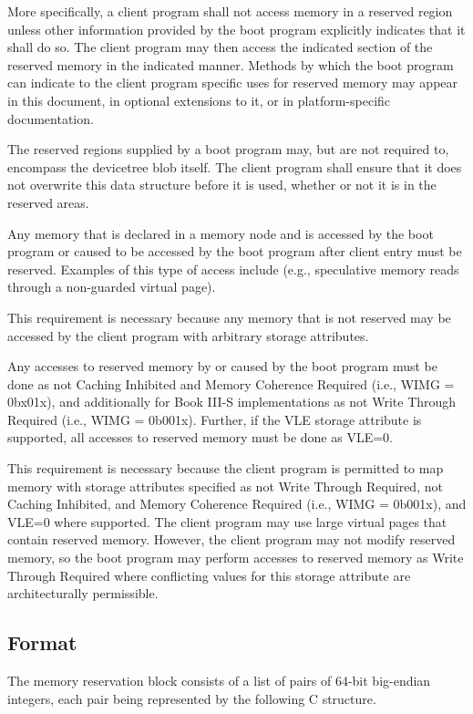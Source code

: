 \documentclass[a4paper,10pt,oneside]{sphinxmanual}
\begin{document}
More specifically, a client program shall not access memory in a
reserved region unless other information provided by the boot program
explicitly indicates that it shall do so. The client program may then
access the indicated section of the reserved memory in the indicated
manner. Methods by which the boot program can indicate to the client
program specific uses for reserved memory may appear in this document,
in optional extensions to it, or in platform-specific documentation.

The reserved regions supplied by a boot program may, but are not
required to, encompass the devicetree blob itself. The client program
shall ensure that it does not overwrite this data structure before it is
used, whether or not it is in the reserved areas.

Any memory that is declared in a memory node and is accessed by the boot
program or caused to be accessed by the boot program after client entry
must be reserved. Examples of this type of access include (e.g.,
speculative memory reads through a non-guarded virtual page).

This requirement is necessary because any memory that is not reserved
may be accessed by the client program with arbitrary storage attributes.

Any accesses to reserved memory by or caused by the boot program must be
done as not Caching Inhibited and Memory Coherence Required (i.e., WIMG
= 0bx01x), and additionally for Book III-S implementations as not Write
Through Required (i.e., WIMG = 0b001x). Further, if the VLE storage
attribute is supported, all accesses to reserved memory must be done as
VLE=0.

This requirement is necessary because the client program is permitted to
map memory with storage attributes specified as not Write Through
Required, not Caching Inhibited, and Memory Coherence Required (i.e.,
WIMG = 0b001x), and VLE=0 where supported. The client program may use
large virtual pages that contain reserved memory. However, the client
program may not modify reserved memory, so the boot program may perform
accesses to reserved memory as Write Through Required where conflicting
values for this storage attribute are architecturally permissible.


\subsection{Format}
\label{flattened-format:format}
The memory reservation block consists of a list of pairs of 64-bit
big-endian integers, each pair being represented by the following C
structure.
\end{document}
